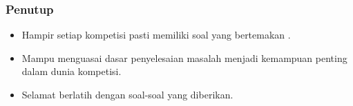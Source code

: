 \begin{frame}
\frametitle{Penutup}
\begin{itemize}
  \item Hampir setiap kompetisi pasti memiliki soal yang bertemakan \fgraph.
  \item Mampu menguasai dasar penyelesaian masalah \fgraph menjadi kemampuan penting dalam dunia kompetisi.
  \item Selamat berlatih dengan soal-soal yang diberikan.
\end{itemize}
\end{frame}


